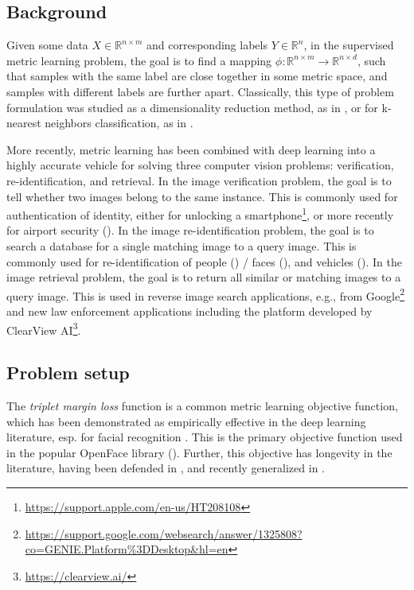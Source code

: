 \documentclass[11pt]{article}
\begin{document}
\subsection{Background}
 
 Given some data $X \in \mathbb{R}^{n \times m}$ and corresponding labels $Y \in \mathbb{R}^n$, in the supervised metric learning problem, the goal is to find a mapping $\phi: \mathbb{R}^{n \times m} \rightarrow \mathbb{R}^{n \times d}$, such that samples with the same label are close together in some metric space, and samples with different labels are further apart. Classically, this type of problem formulation was studied as a dimensionality reduction method, as in \cite{hadsell_dimensionality_2006}, or for k-nearest neighbors classification, as in \cite{weinberger_distance_2009}. 

More recently, metric learning has been combined with deep learning into a highly accurate vehicle for solving three computer vision problems: verification, re-identification, and retrieval. In the image verification problem, the goal is to tell whether two images belong to the same instance. This is commonly used for authentication of identity, either for unlocking a smartphone\footnote{\url{https://support.apple.com/en-us/HT208108}}, or more recently for airport security (\cite{mccartney_are_2019}). In the image re-identification problem, the goal is to search a database for a single matching image to a query image. This is commonly used for re-identification of people (\cite{zheng_scalable_2015}) / faces (\cite{schroff_facenet_2015}), and vehicles (\cite{liu_deep_2016}). In the image retrieval problem, the goal is to return all similar or matching images to a query image. This is used in reverse image search applications, e.g., from Google\footnote{\url{https://support.google.com/websearch/answer/1325808?co=GENIE.Platform\%3DDesktop&hl=en}} and new law enforcement applications including the platform developed by ClearView AI\footnote{\url{https://clearview.ai/}}.

\subsection{Problem setup}

The \textit{triplet margin loss} function is a common metric learning objective function, which has been demonstrated as empirically effective in the deep learning literature, esp. for facial recognition \cite{schroff_facenet_2015}. This is the primary objective function used in the popular OpenFace library (\cite{amos_openface_2016}). Further, this objective has longevity in the literature, having been defended in \cite{hermans_defense_2017}, and recently generalized in \cite{qian_softtriple_2019}.
\end{document}
